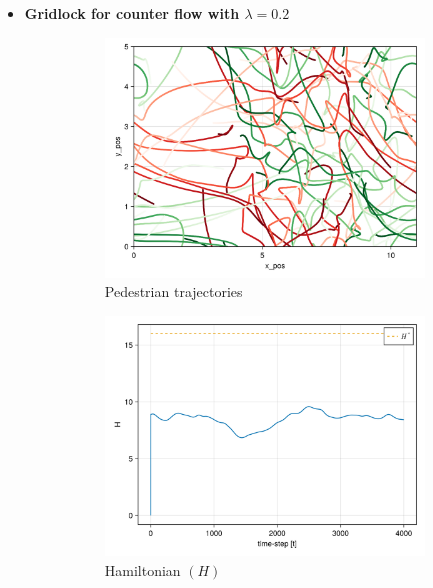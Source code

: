 \begin{itemize}
    \item \textbf{Gridlock for counter flow with $\lambda = 0.2$}
    \begin{figure}[H]
        \centering
        \begin{subfigure}{\textwidth}
            \centering
            \includegraphics[width=0.6\linewidth]{figures/counter_gridlockdflow_4000.png}
            \caption{Pedestrian trajectories}
            \label{plot:countergridlock_traj}
        \end{subfigure}
        \begin{subfigure}{.40\textwidth}
            \centering
            \includegraphics[width=\linewidth]{figures/H_counter_gridlock.png}
            \caption{Hamiltonian $(H)$}
            \label{plot:countergridlock_h}
        \end{subfigure}
        \begin{subfigure}{.40\textwidth}
            \centering

\end{subfigure}
\end{figure}
\end{itemize}
